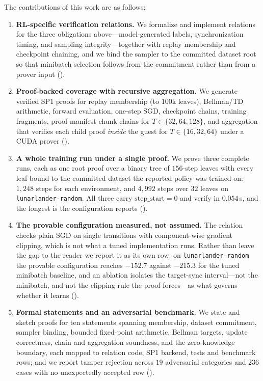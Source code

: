 The contributions of this work are as follows:
\begin{enumerate}[leftmargin=1.8em]
  \item \textbf{RL-specific verification relations.} We formalize and implement
  relations for the three obligations above---model-generated labels,
  synchronization timing, and sampling integrity---together with replay
  membership and checkpoint chaining, and we bind the sampler to the committed
  dataset root so that minibatch selection follows from the commitment rather
  than from a prover input ().

  \item \textbf{Proof-backed coverage with recursive aggregation.} We generate
  verified SP1 proofs for replay membership (to $100$k leaves), Bellman/TD
  arithmetic, forward evaluation, one-step SGD, checkpoint chains, training
  fragments, proof-manifest chunk chains for $T \in \{32,64,128\}$, and
  aggregation that verifies each child proof \emph{inside} the guest for
  $T \in \{16,32,64\}$ under a CUDA prover
  ().

  \item \textbf{A whole training run under a single proof.} We prove three
  complete runs, each as one root proof over a binary tree of $156$-step leaves
  with every leaf bound to the committed dataset the reported policy was
  trained on: $1{,}248$ steps for each environment, and $4{,}992$ steps over
  $32$ leaves on \texttt{lunarlander-random}. All three carry
  $\mathrm{step\_start}=0$ and verify in $0.054$\,s, and the longest is the
  configuration  reports
  ().

  \item \textbf{The provable configuration measured, not assumed.} The relation
  checks plain SGD on single transitions with component-wise gradient clipping,
  which is not what a tuned implementation runs. Rather than leave the gap to
  the reader we report it as its own row: on \texttt{lunarlander-random} the
  provable configuration reaches $-152.7$ against $-215.3$ for the tuned
  minibatch baseline, and an ablation isolates the target-sync interval---not
  the minibatch, and not the clipping rule the proof forces---as what governs
  whether it learns ().

  \item \textbf{Formal statements and an adversarial benchmark.} We state and
  sketch proofs for ten statements spanning membership, dataset commitment,
  sampler binding, bounded fixed-point arithmetic, Bellman targets, update
  correctness, chain and aggregation soundness, and the zero-knowledge boundary,
  each mapped to relation code, SP1 backend, tests and benchmark rows; and we
  report tamper rejection across $19$ adversarial
  categories and $236$ cases with no unexpectedly accepted row
  ().
\end{enumerate}

